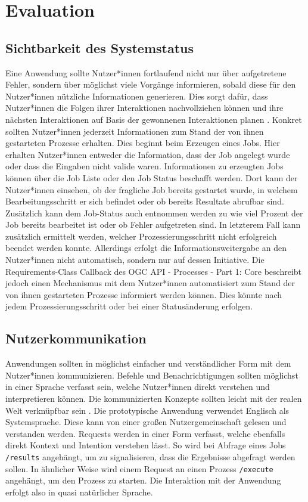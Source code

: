 \newpage
\restoregeometry
\section{Evaluation}
\subsection{Sichtbarkeit des Systemstatus}
Eine Anwendung sollte Nutzer*innen fortlaufend nicht nur über aufgetretene Fehler, sondern über möglichst 
viele Vorgänge informieren, sobald diese für den Nutzer*innen nützliche Informationen generieren. 
Dies sorgt dafür, dass Nutzer*innen die Folgen ihrer Interaktionen nachvollziehen können und ihre nächsten 
Interaktionen auf Basis der gewonnenen Interaktionen planen \cite{usability_engineering,nielsen_poster,heuristics_website}. 
Konkret sollten Nutzer*innen jederzeit Informationen zum Stand der von ihnen gestarteten Prozesse erhalten. 
Dies beginnt beim Erzeugen eines Jobs. Hier erhalten Nutzer*innen entweder die Information, dass der Job angelegt wurde oder 
dass die Eingaben nicht valide waren. Informationen zu erzeugten Jobs können über die Job Liste oder den Job Status 
beschafft werden. Dort kann der Nutzer*innen einsehen, ob der fragliche Job bereits gestartet wurde, in welchem 
Bearbeitungsschritt er sich befindet oder ob bereits Resultate abrufbar sind. Zusätzlich kann dem Job-Status auch 
entnommen werden zu wie viel Prozent der Job bereits bearbeitet ist oder ob Fehler aufgetreten sind. In letzterem
Fall kann zusätzlich ermittelt werden, welcher Prozessierungsschritt nicht erfolgreich beendet werden konnte. 
Allerdings erfolgt die Informationsweitergabe an den Nutzer*innen nicht automatisch, sondern nur auf dessen Initiative.   
Die Requirements-Class Callback des OGC API - Processes - Part 1: Core beschreibt jedoch einen Mechanismus mit dem
Nutzer*innen automatisiert zum Stand der von ihnen gestarteten Prozesse informiert werden können. Dies könnte nach 
jedem Prozessierungsschritt oder bei einer Statusänderung erfolgen. 

\subsection{Nutzerkommunikation}
Anwendungen sollten in möglichst einfacher und verständlicher Form mit dem Nutzer*innen kommunizieren. 
Befehle und Benachrichtigungen sollten möglichst in einer Sprache verfasst sein, welche Nutzer*innen direkt 
verstehen und interpretieren können. Die kommunizierten Konzepte sollten leicht mit der realen Welt 
verknüpfbar sein \cite{usability_engineering,nielsen_poster,heuristics_website}.
Die prototypische Anwendung verwendet Englisch als Systemsprache. Diese kann von einer großen 
Nutzergemeinschaft gelesen und verstanden werden. Requests werden in einer Form verfasst, welche 
ebenfalls direkt Kontext und Intention verstehen lässt. So wird bei Abfrage eines Jobs \verb|/results| 
angehängt, um zu signalisieren, dass die Ergebnisse abgefragt werden sollen. In ähnlicher Weise wird einem 
Request an einen Prozess \verb|/execute| angehängt, um den Prozess zu starten. Die Interaktion 
mit der Anwendung erfolgt also in quasi natürlicher Sprache. 

